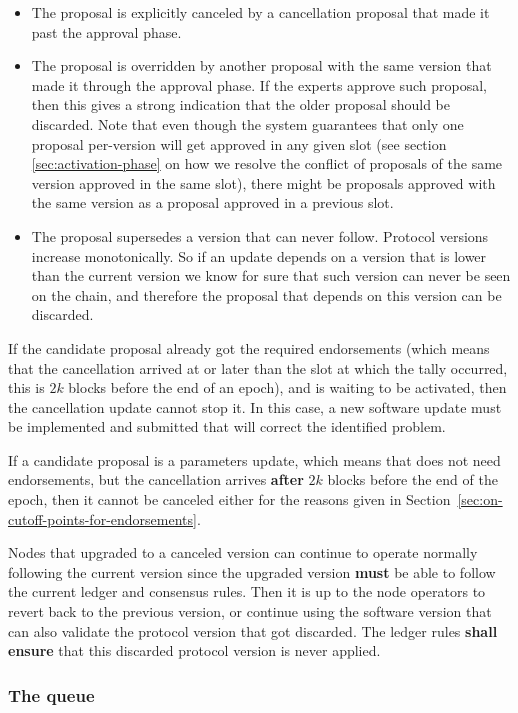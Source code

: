 \begin{itemize}
	\item The proposal is explicitly canceled by a cancellation proposal that
	made
	it past the approval phase.
	\item The proposal is overridden by another proposal with the same version
	that
	made it through the approval phase. If the experts approve such proposal,
	then
	this gives a strong indication that the older proposal should be discarded.
	Note that even though the system guarantees that only one proposal
	per-version
	will get approved in any given slot (see section \ref{sec:activation-phase}
	on how we resolve the conflict of proposals of the same version approved in
	the same slot),
	there might be proposals approved with
	the same version as a proposal approved in a previous slot.
	\item The proposal supersedes a version that can never follow. Protocol
	versions
	increase monotonically. So if an update depends on a version that is lower
	than the current version we know for sure that such version can never be
	seen
	on the chain, and therefore the proposal that depends on this version can be
	discarded.
\end{itemize}

If the candidate proposal already got the required endorsements (which means
that the cancellation arrived at or later than the slot at which the tally
occurred, this is $2k$ blocks before the end of an epoch), and is waiting to
be activated, then the cancellation update cannot stop it. In this case, a new
software update must be implemented and submitted that will correct the
identified problem.

If a candidate proposal is a parameters update, which means that does not need
endorsements, but the cancellation arrives \textbf{after} $2k$ blocks before
the end of the epoch, then it cannot be canceled either for the reasons given in
Section~\ref{sec:on-cutoff-points-for-endorsements}.

Nodes that upgraded to a canceled version can continue to operate normally
following the current version since the upgraded version \textbf{must} be able
to follow the current ledger and consensus rules.
%
Then it is up to the node operators to revert back to the previous version, or
continue using the software version that can also validate the protocol version
that got discarded. The ledger rules \textbf{shall ensure} that this discarded
protocol version is never applied.

\subsubsection{The queue}
\label{sec:the-queue}

